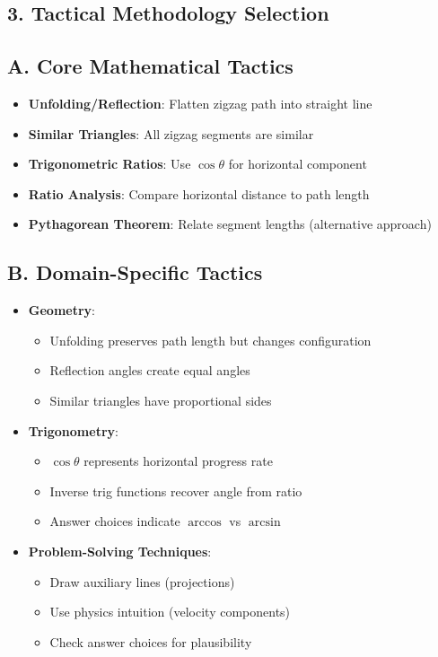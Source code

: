 \documentclass[11pt]{article}
\begin{document}
\begin{tacticalbox}
\section*{3. Tactical Methodology Selection}

\subsection*{A. Core Mathematical Tactics}
\begin{itemize}[leftmargin=*]
    \item \textbf{Unfolding/Reflection}: Flatten zigzag path into straight line
    \item \textbf{Similar Triangles}: All zigzag segments are similar
    \item \textbf{Trigonometric Ratios}: Use $\cos\theta$ for horizontal component
    \item \textbf{Ratio Analysis}: Compare horizontal distance to path length
    \item \textbf{Pythagorean Theorem}: Relate segment lengths (alternative approach)
\end{itemize}

\subsection*{B. Domain-Specific Tactics}
\begin{itemize}[leftmargin=*]
    \item \textbf{Geometry}:
    \begin{itemize}
        \item Unfolding preserves path length but changes configuration
        \item Reflection angles create equal angles
        \item Similar triangles have proportional sides
    \end{itemize}
    \item \textbf{Trigonometry}:
    \begin{itemize}
        \item $\cos\theta$ represents horizontal progress rate
        \item Inverse trig functions recover angle from ratio
        \item Answer choices indicate $\arccos$ vs $\arcsin$
    \end{itemize}
    \item \textbf{Problem-Solving Techniques}:
    \begin{itemize}
        \item Draw auxiliary lines (projections)
        \item Use physics intuition (velocity components)
        \item Check answer choices for plausibility
    \end{itemize}
\end{itemize}


\end{tacticalbox}
\end{document}
